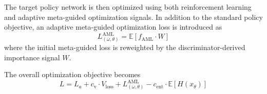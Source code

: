 \documentclass[journal]{IEEEtran}
\begin{document}
The target policy network is then optimized using both reinforcement learning and adaptive meta-guided optimization signals. In addition to the standard policy objective, an adaptive meta-guided optimization loss is introduced as
\begin{equation}
  L^{\text{AML}}_{(\omega,\theta)}=\mathbb{E}[f_{\text{AML}}\cdot W]
\end{equation}
where the initial meta-guided loss is reweighted by the discriminator-derived importance signal $W$\cite{wang2021learning}.


The overall optimization objective becomes
\begin{equation}
\label{actor_loss}
  L = L_{a} + c_{\text{v}} \cdot V_{\text{loss}} + L^{\text{AML}}_{(\omega,\theta)} - c_{\text{ent}} \cdot \mathbb{E}[H(x_{\theta})]
\end{equation}
\end{document}

